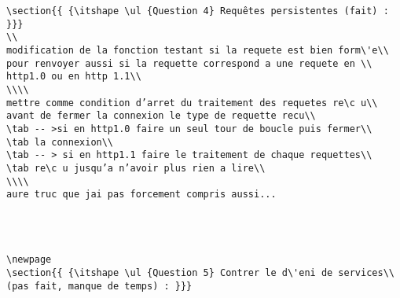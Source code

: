 \documentclass[final,twoside,onecolumn,10pt]{article}
\newcommand\tab[1][1cm]{\hspace*{#1}}
\begin{document}
\begin {verbatim}
\section{{ {\itshape \ul {Question 4} Requêtes persistentes (fait) : }}}
\\
modification de la fonction testant si la requete est bien form\'e\\
pour renvoyer aussi si la requette correspond a une requete en \\
http1.0 ou en http 1.1\\
\\\\
mettre comme condition d’arret du traitement des requetes re\c u\\
avant de fermer la connexion le type de requette recu\\
\tab -- >si en http1.0 faire un seul tour de boucle puis fermer\\
\tab la connexion\\
\tab -- > si en http1.1 faire le traitement de chaque requettes\\
\tab re\c u jusqu’a n’avoir plus rien a lire\\
\\\\
aure truc que jai pas forcement compris aussi...




\newpage
\section{{ {\itshape \ul {Question 5} Contrer le d\'eni de services\\ (pas fait, manque de temps) : }}}


\end{verbatim}
\end{document}
